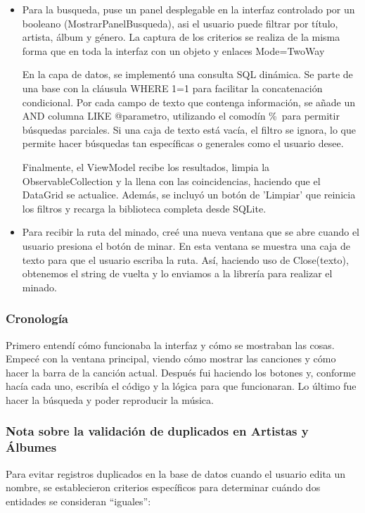 \documentclass{article}
\begin{document}
\begin{itemize}
        
    \item Para la busqueda, puse un panel desplegable en la interfaz controlado por un booleano (MostrarPanelBusqueda), asi el usuario puede filtrar por título, artista, álbum y género. La captura de los criterios se realiza de la misma forma que en toda la interfaz con un objeto y enlaces Mode=TwoWay
    
    En la capa de datos, se implementó una consulta SQL dinámica. Se parte de una base con la cláusula WHERE 1=1 para facilitar la concatenación condicional. Por cada campo de texto que contenga información, se añade un AND columna LIKE @parametro, utilizando el comodín \%\ para permitir búsquedas parciales. Si una caja de texto está vacía, el filtro se ignora, lo que permite hacer búsquedas tan específicas o generales como el usuario desee.
    
    Finalmente, el ViewModel recibe los resultados, limpia la ObservableCollection y la llena con las coincidencias, haciendo que el DataGrid se actualice. Además, se incluyó un botón de 'Limpiar' que reinicia los filtros y recarga la biblioteca completa desde SQLite.

    \item Para recibir la ruta del minado, creé una nueva ventana que se abre cuando el usuario presiona el botón de minar. En esta ventana se muestra una caja de texto para que el usuario escriba la ruta. Así, haciendo uso de Close(texto), obtenemos el string de vuelta y lo enviamos a la librería para realizar el minado.
    
    \end{itemize}

\subsubsection{Cronología}
Primero entendí cómo funcionaba la interfaz y cómo se mostraban las cosas. Empecé con la ventana principal, viendo cómo mostrar las canciones y cómo hacer la barra de la canción actual. Después fui haciendo los botones y, conforme hacía cada uno, escribía el código y la lógica para que funcionaran. Lo último fue hacer la búsqueda y poder reproducir la música.

\subsubsection*{Nota sobre la validación de duplicados en Artistas y Álbumes}

Para evitar registros duplicados en la base de datos cuando el usuario edita un nombre, se establecieron criterios específicos para determinar cuándo dos entidades se consideran ``iguales'':
\end{document}
